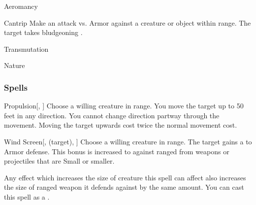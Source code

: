 
\begin{spellsection}{Aeromancy}

\begin{spellheader}
\end{spellheader}


\begin{ability}{Cantrip}
Make an attack vs. Armor against a creature or object within \rngmed range.
\hit The target takes bludgeoning .
\end{ability}




 Transmutation

 Nature
\end{spellsection}


\subsubsection{Spells}


\lowercase{\hypertarget{spell:Propulsion}{}}\label{spell:Propulsion}
\begin{ability}[\nth{1}]{\hypertarget{spell:Propulsion}{Propulsion}}[, ]
Choose a willing creature in \rngclose range.
You move the target up to 50 feet in any direction.
You cannot change direction partway through the movement.
Moving the target upwards cost twice the normal movement cost.
\end{ability}
\vspace{0.25em}



\lowercase{\hypertarget{spell:Wind Screen}{}}\label{spell:Wind Screen}
\begin{ability}[\nth{1}]{\hypertarget{spell:Wind Screen}{Wind Screen}}[,  (target), ]
Choose a willing creature in \rngclose range.
The target gains a   to Armor defense.
This bonus is increased to  against ranged  from weapons or projectiles that are Small or smaller.

Any effect which increases the size of creature this spell can affect also increases the size of ranged weapon it defends against by the same amount.
You can cast this spell as a .
\end{ability}
\vspace{0.25em}



